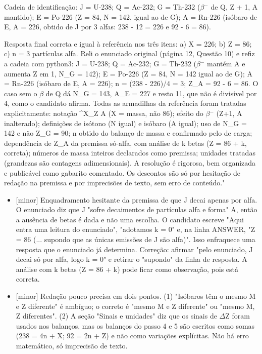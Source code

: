 \documentclass{article}%
\begin{document}
Cadeia de identificação: J = U{-}238; Q = Ac{-}232; G = Th{-}232 ($\beta$$^{-}$ de Q, Z + 1, A mantido); E = Po{-}226 (Z = 84, N = 142, igual ao de G); A = Rn{-}226 (isóbaro de E, A = 226, obtido de J por 3 alfas: 238 - 12 = 226 e 92 - 6 = 86).\par %
Resposta final correta e igual à referência nos três itens: a) X = 226; b) Z = 86; c) n = 3 partículas alfa. Reli o enunciado original (página 12, Questão 10) e refiz a cadeia com python3: J = U{-}238; Q = Ac{-}232; G = Th{-}232 ($\beta$$^{-}$ mantém A e aumenta Z em 1, N\_G = 142); E = Po{-}226 (Z = 84, N = 142 igual ao de G); A = Rn{-}226 (isóbaro de E, A = 226); n = (238 - 226)/4 = 3; Z\_A = 92 - 6 = 86. O caso sem o $\beta$ de Q dá N\_G = 143, A\_E = 227 e resto 11, que não é divisível por 4, como o candidato afirma. Todas as armadilhas da referência foram tratadas explicitamente: notação \^{}X\_Z A (X = massa, não 86); efeito do $\beta$$^{-}$ (Z+1, A inalterado); definições de isótono (N igual) e isóbaro (A igual); uso de N\_G = 142 e não Z\_G = 90; n obtido do balanço de massa e confirmado pelo de carga; dependência de Z\_A da premissa só{-}alfa, com análise de k betas (Z = 86 + k, correta); números de massa inteiros declarados como premissa; unidades tratadas (grandezas são contagens adimensionais). A resolução é rigorosa, bem organizada e publicável como gabarito comentado. Os descontos são só por hesitação de redação na premissa e por imprecisões de texto, sem erro de conteúdo."%
\begin{itemize}%
\item%
{[}minor{]} Enquadramento hesitante da premissa de que J decai apenas por alfa. O enunciado diz que J "sofre decaimentos de partículas alfa e forma" A, então a ausência de betas é dada e não uma escolha. O candidato escreve "Aqui entra uma leitura do enunciado", "adotamos k = 0" e, na linha ANSWER, "Z = 86 (... supondo que as únicas emissões de J são alfa)". Isso enfraquece uma resposta que o enunciado já determina. Correção: afirmar "pelo enunciado, J decai só por alfa, logo k = 0" e retirar o "supondo" da linha de resposta. A análise com k betas (Z = 86 + k) pode ficar como observação, pois está correta.%
\item%
{[}minor{]} Redação pouco precisa em dois pontos. (1) "Isóbaros têm o mesmo M e Z diferente" é ambíguo; o correto é "mesmo M e Z diferente" ou "mesmo M, Z diferentes". (2) A seção "Sinais e unidades" diz que os sinais de $\Delta$Z foram usados nos balanços, mas os balanços do passo 4 e 5 são escritos como somas (238 = 4n + X; 92 = 2n + Z) e não como variações explícitas. Não há erro matemático, só imprecisão de texto.%
\end{itemize}%
\end{document}
